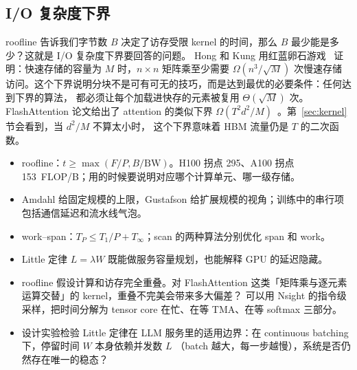 \subsection{I/O 复杂度下界}

roofline 告诉我们字节数 $B$ 决定了访存受限 kernel 的时间，那么 $B$ 最少能是多少？这就是 I/O 复杂度下界要回答的问题。
Hong 和 Kung 用红蓝卵石游戏~\cite{hong1981io} 证明：快速存储的容量为 $M$ 时，$n\times n$ 矩阵乘至少需要
$\Omega(n^3/\sqrt{M})$ 次慢速存储访问。这个下界说明分块不是可有可无的技巧，而是达到最优的必要条件：任何达到下界的算法，
都必须让每个加载进快存的元素被复用 $\Theta(\sqrt{M})$ 次。FlashAttention 论文给出了 attention 的类似下界
$\Omega(T^2d^2/M)$~\cite{dao2022flashattention}。第~\ref{sec:kernel} 节会看到，当 $d^2/M$ 不算太小时，
这个下界意味着 HBM 流量仍是 $T$ 的二次函数。

\begin{keypts}
\begin{itemize}
\item roofline：$t\ge\max(F/P,B/\mathrm{BW})$。H100 拐点 295、A100 拐点 153~FLOP/B；用的时候要说明对应哪个计算单元、哪一级存储。
\item Amdahl 给固定规模的上限，Gustafson 给扩展规模的视角；训练中的串行项包括通信延迟和流水线气泡。
\item work--span：$T_P\le T_1/P+T_\infty$；scan 的两种算法分别优化 span 和 work。
\item Little 定律 $L=\lambda W$ 既能做服务容量规划，也能解释 GPU 的延迟隐藏。
\end{itemize}
\end{keypts}

\begin{research}
\begin{itemize}
\item roofline 假设计算和访存完全重叠。对 FlashAttention 这类「矩阵乘与逐元素运算交替」的 kernel，重叠不完美会带来多大偏差？
可以用 Nsight 的指令级采样，把时间分解为 tensor core 在忙、在等 TMA、在等 softmax 三部分。
\item 设计实验检验 Little 定律在 LLM 服务里的适用边界：在 continuous batching 下，停留时间 $W$ 本身依赖并发数 $L$
（batch 越大，每一步越慢），系统是否仍然存在唯一的稳态？
\end{itemize}
\end{research}
